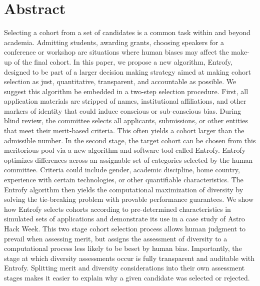 \documentclass[10pt,letterpaper]{article}
\begin{document}
\section*{Abstract}
Selecting a cohort from a set of candidates is a common task within and beyond academia. Admitting students, awarding grants, choosing speakers for a conference or workshop are situations where human biases may affect the make-up of the final cohort. In this paper, we propose a new algorithm, Entrofy, designed to be part of a larger decision making strategy aimed at making cohort selection as just, quantitative, transparent, and accountable as possible.
We suggest this algorithm be embedded in a two-step selection procedure. First, all application materials are stripped of names, institutional affiliations, and other markers of identity that could induce conscious or sub-conscious bias. During blind review, the committee selects all applicants, submissions, or other entities that meet their merit-based criteria. This often yields a cohort larger than the admissible number.
In the second stage, the target cohort can be chosen from this meritorious pool via a new algorithm and software tool called Entrofy. Entrofy optimizes differences across an assignable set of categories selected by the human committee. Criteria could include gender, academic discipline, home country, experience with certain technologies, or other quantifiable characteristics. The Entrofy algorithm then yields the computational maximization of diversity by solving the tie-breaking problem with provable performance guarantees. We show how Entrofy selects cohorts according to pre-determined characteristics in simulated sets of applications and demonstrate its use in a case study of Astro Hack Week. 
This two stage cohort selection process allows human judgment to prevail when assessing merit, but assigns the assessment of diversity to a computational process less likely to be beset by human bias. Importantly, the stage at which diversity assessments occur is fully transparent and auditable with Entrofy. Splitting merit and diversity considerations into their own assessment stages makes it easier to explain why a given candidate was selected or rejected. 


\end{document}
